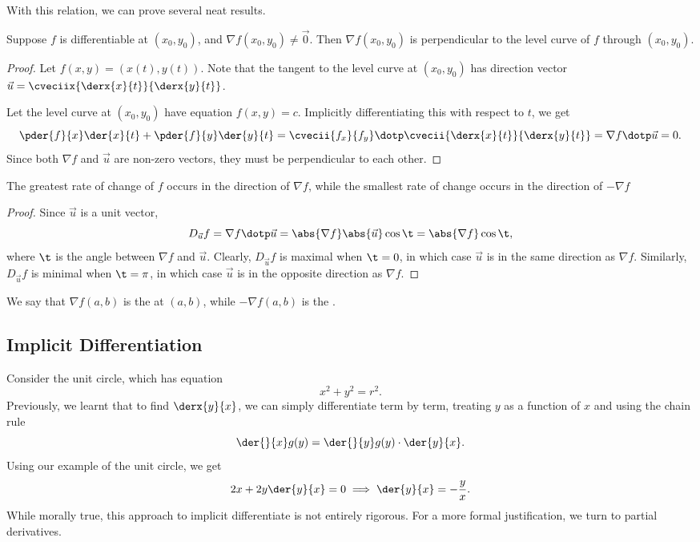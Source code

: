 With this relation, we can prove several neat results.

\begin{proposition}
    Suppose $f$ is differentiable at $(x_0, y_0)$, and $\nabla f(x_0, y_0) \neq \vec 0$. Then $\nabla f(x_0, y_0)$ is perpendicular to the level curve of $f$ through $(x_0, y_0)$.
\end{proposition}
\begin{proof}
    Let $f(x, y) = (x(t), y(t))$. Note that the tangent to the level curve at $(x_0, y_0)$ has direction vector $\vec u = \cveciix{\derx{x}{t}}{\derx{y}{t}}$.
    
    Let the level curve at $(x_0, y_0)$ have equation $f(x, y) = c$. Implicitly differentiating this with respect to $t$, we get \[\pder{f}{x} \der{x}{t} + \pder{f}{y} \der{y}{t} = \cvecii{f_x}{f_y} \dotp \cvecii{\derx{x}{t}}{\derx{y}{t}} = \nabla f \dotp \vec u = 0.\] Since both $\nabla f$ and $\vec u$ are non-zero vectors, they must be perpendicular to each other.
\end{proof}

\begin{proposition}
    The greatest rate of change of $f$ occurs in the direction of $\nabla f$, while the smallest rate of change occurs in the direction of $-\nabla f$
\end{proposition}
\begin{proof}
    Since $\vec u$ is a unit vector, \[D_{\vec u} f = \nabla f \dotp \vec u = \abs{\nabla f} \abs{\vec u} \cos \t = \abs{\nabla f} \cos \t,\] where $\t$ is the angle between $\nabla f$ and $\vec u$. Clearly, $D_{\vec u} f$ is maximal when $\t = 0$, in which case $\vec u$ is in the same direction as $\nabla f$. Similarly, $D_{\vec u} f$ is minimal when $\t = \pi$, in which case $\vec u$ is in the opposite direction as $\nabla f$.
\end{proof}

We say that $\nabla f(a,b)$ is the  at $(a, b)$, while $-\nabla f(a, b)$ is the .

\subsection{Implicit Differentiation}

Consider the unit circle, which has equation \[x^2 + y^2 = r^2.\] Previously, we learnt that to find $\derx{y}{x}$, we can simply differentiate term by term, treating $y$ as a function of $x$ and using the chain rule \[\der{}{x} g(y) = \der{}{y} g(y) \cdot \der{y}{x}.\] Using our example of the unit circle, we get \[2x + 2y \der{y}{x} = 0 \implies \der{y}{x} = -\frac{y}{x}.\] While morally true, this approach to implicit differentiate is not entirely rigorous. For a more formal justification, we turn to partial derivatives.

